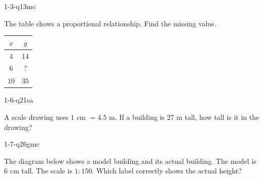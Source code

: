 
\begin{practiceQuestion}{1-3-q13}{mc}
\begin{questionText}
The table shows a proportional relationship. Find the missing value.

\begin{center}
\begin{tabular}{|c|c|}
\hline $x$ & $y$ \\ \hline $4$ & $14$ \\ $6$ & $?$ \\ $10$ & $35$ \\ \hline
\end{tabular}
\end{center}
\end{questionText}
\end{practiceQuestion}

\begin{practiceQuestion}{1-6-q21}{sa}
\begin{questionText}
A scale drawing uses $1$ cm $= 4.5$ m. If a building is $27$ m tall, how tall is it in the drawing?
\end{questionText}
\end{practiceQuestion}

\begin{practiceQuestion}{1-7-q26}{gmc}
\begin{questionText}
The diagram below shows a model building and its actual building. The model is $6$ cm tall. The scale is $1 : 150$. Which label correctly shows the actual height?

\begin{center}
\end{center}
\end{questionText}
\end{practiceQuestion}

